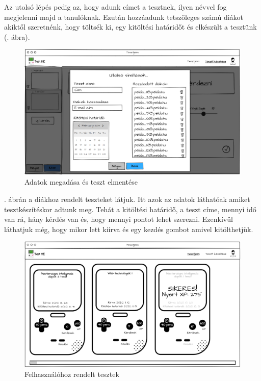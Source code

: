 Az utolsó lépés pedig az, hogy adunk címet a tesztnek, ilyen névvel fog megjelenni majd a tanulóknak. Ezután hozzáadunk tetszőleges számú diákot akiktől szeretnénk, hogy töltsék ki, egy kitöltési határidőt és elkészült a tesztünk (. ábra).

\begin{figure}[h!]
    \centering
    \includegraphics[width=\linewidth]{images/make_test4_wireframe.png}
    \caption{Adatok megadása és teszt elmentése}
    \label{fig:save_test}
\end{figure}


. ábrán a diákhoz rendelt teszteket látjuk. Itt azok az adatok láthatóak amiket tesztkészítéskor adtunk meg. Tehát a kitöltési határidő, a teszt címe, mennyi idő van rá, hány kérdés van és, hogy mennyi pontot lehet szerezni. Ezenkívül láthatjuk még, hogy mikor lett kiírva és egy kezdés gombot amivel kitölthetjük.

\begin{figure}[h!]
    \centering
    \includegraphics[width=\linewidth]{images/my_tests_wireframe.png}
    \caption{Felhasználóhoz rendelt tesztek}
    \label{fig:my_tests_mockup}
\end{figure}

